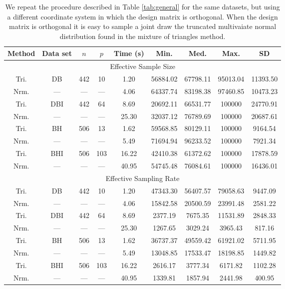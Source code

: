 \documentclass{article}
\begin{document}
\begin{table}

\centering
\begin{tabular}{c c c c c c c c c}
Method & Data set & $n$ & $p$ & Time (s) & Min. & Med. & Max. & SD \\
\hline
\multicolumn{9}{c}{Effective Sample Size} \\
Tri. & DB  & 442 &  10 & 1.20 & 56884.02 & 67798.11 & 95013.04 & 11393.50 \\
Nrm. & --- & --- & --- & 4.06 & 64337.74 & 83198.38 & 97460.85 & 10473.23 \\

Tri. & DBI & 442 &  64 &  8.69 & 20692.11 & 66531.77 & 100000 & 24770.91 \\
Nrm. & --- & --- & --- & 25.30 & 32037.12 & 76789.69 & 100000 & 20687.61 \\

Tri. & BH  & 506 &  13 &  1.62 & 59568.85 & 80129.11 & 100000 & 9164.54 \\
Nrm. & --- & --- & --- &  5.49 & 71694.94 & 96233.52 & 100000 & 7921.34 \\

Tri. & BHI & 506 & 103 & 16.22 & 42410.38 & 61372.62 & 100000 & 17878.59 \\
Nrm. & --- & --- & --- & 40.95 & 54745.48 & 76084.61 & 100000 & 16436.01 \\

\multicolumn{9}{c}{Effective Sampling Rate} \\

Tri. & DB  & 442 &  10 & 1.20 & 47343.30 & 56407.57 & 79058.63 & 9447.09 \\
Nrm. & --- & --- & --- & 4.06 & 15842.58 & 20500.59 & 23991.48 & 2581.22 \\

Tri. & DBI & 442 &  64 &  8.69 & 2377.19 & 7675.35 & 11531.89 & 2848.33 \\
Nrm. & --- & --- & --- & 25.30 & 1267.65 & 3029.24 &  3965.43 &  817.16 \\

Tri. & BH  & 506 &  13 &  1.62 & 36737.37 & 49559.42 & 61921.02 & 5711.95 \\
Nrm. & --- & --- & --- &  5.49 & 13048.85 & 17533.47 & 18198.85 & 1449.82 \\

Tri. & BHI & 506 & 103 & 16.22 & 2616.17 & 3777.34 & 6171.82 & 1102.28 \\
Nrm. & --- & --- & --- & 40.95 & 1339.81 & 1857.94 & 2441.98 &  400.95 

\end{tabular}
\caption{ We repeat the procedure described in Table \ref{tab:general} for the
  same datasets, but using a different coordinate system in which the design matrix
  is orthogonal.  When the design matrix is orthogonal it is easy to sample a
  joint draw the truncated multivaiate normal distribution found in the mixture
  of triangles method.}
\label{tab:ortho}
\end{table}
\end{document}
